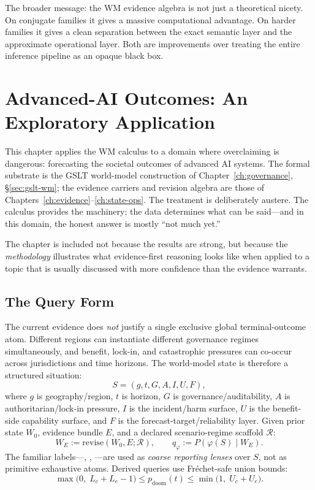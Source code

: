 \documentclass[11pt,openany]{report}
\begin{document}
\noindent
The broader message: the WM evidence algebra is not just a
theoretical nicety.  On conjugate families it gives a massive
computational advantage.  On harder families it gives a clean
separation between the exact semantic layer and the approximate
operational layer.  Both are improvements over treating the
entire inference pipeline as an opaque black box.


\chapter{Advanced-AI Outcomes: An Exploratory Application}
\label{ch:ai-outcomes}

This chapter applies the WM calculus to a domain where
overclaiming is dangerous: forecasting the societal outcomes of
advanced AI systems.  The formal substrate is the GSLT
world-model construction of Chapter~\ref{ch:governance},
\S\ref{sec:gslt-wm}; the evidence carriers and revision algebra
are those of Chapters~\ref{ch:evidence}--\ref{ch:state-ops}.
The treatment is deliberately austere.
The calculus provides the machinery; the data determines what
can be said---and in this domain, the honest answer is mostly
``not much yet.''

The chapter is included not because the results are strong,
but because the \emph{methodology} illustrates what
evidence-first reasoning looks like when applied to a topic
that is usually discussed with more confidence than the evidence
warrants.


\section{The Query Form}

The current evidence does \emph{not} justify a single exclusive
global terminal-outcome atom.  Different regions can instantiate
different governance regimes simultaneously, and benefit, lock-in,
and catastrophic pressures can co-occur across jurisdictions and
time horizons.  The world-model state is therefore a structured
situation:
\[
  S = (g, t, G, A, I, U, F),
\]
where $g$ is geography/region, $t$ is horizon, $G$ is
governance/auditability, $A$ is authoritarian/lock-in pressure,
$I$ is the incident/harm surface, $U$ is the benefit-side
capability surface, and $F$ is the forecast-target/reliability
layer.  Given prior state $W_0$, evidence bundle $E$, and a
declared scenario-regime scaffold $\mathcal{R}$:
\[
  W_E := \mathrm{revise}(W_0, E; \mathcal{R}),
  \qquad
  q_{\varphi} := P(\varphi(S) \mid W_E).
\]
The familiar labels---,
, ---are used as
\emph{coarse reporting lenses} over $S$, not as primitive
exhaustive atoms.  Derived queries use Fréchet-safe union
bounds:
\[
  \max\!\bigl(0,\;L_c + L_e - 1\bigr)
  \le p_{\mathrm{doom}}(t) \le
  \min\!\bigl(1,\;U_c + U_e\bigr).
\]
\end{document}
